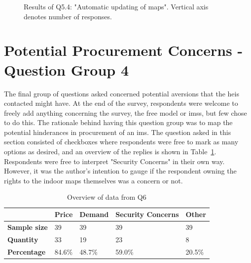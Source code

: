 \begin{figure}[H]
    \centering
    \caption{Results of Q5.4: "Automatic updating of maps". Vertical axis denotes number of responses.}
    \label{fig:q54}
\end{figure}

\newpage

\section{Potential Procurement Concerns - Question Group 4}
The final group of questions asked concerned potential aversions that the \glspl{hei} contacted might have. At the end of the survey, respondents were welcome to freely add anything concerning the survey, the free model or \glspl{ims}, but few chose to do this. The rationale behind having this question group was to map the potential hinderances in procurement of an \gls{ims}. The question asked in this section consisted of checkboxes where respondents were free to mark as many options as desired, and an overview of the replies is shown in Table~\ref{q6}. Respondents were free to interpret "Security Concerns" in their own way. However, it was the author's intention to gauge if the respondent owning the rights to the indoor maps themselves was a concern or not.


\begin{table}[H]
\centering
\caption{Overview of data from Q6}
\label{q6}
\begin{tabular}{l|l|l|l|l|}
\cline{2-5}
                                           & \textbf{Price} & \textbf{Demand} & \textbf{Security Concerns} & \textbf{Other} \\ \hline
\multicolumn{1}{|l|}{\textbf{Sample size}} & 39             & 39              & 39                         & 39             \\ \hline
\multicolumn{1}{|l|}{\textbf{Quantity}}    & 33             & 19              & 23                         & 8              \\ \hline
\multicolumn{1}{|l|}{\textbf{Percentage}}  & 84.6\%         & 48.7\%          & 59.0\%                     & 20.5\%         \\ \hline
\end{tabular}
\end{table}


